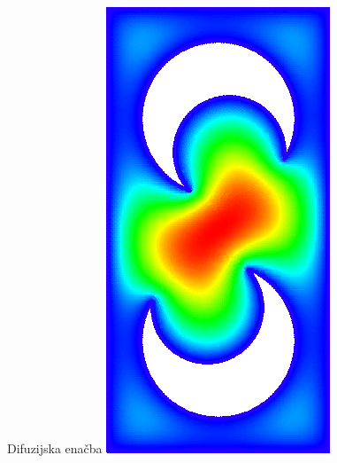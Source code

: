\begin{frame}{Difuzijska enačba}
  \includegraphics[height=0.4\textheight]{resources/poisson_weird2.png}

  \vspace{1ex}


\end{frame}
